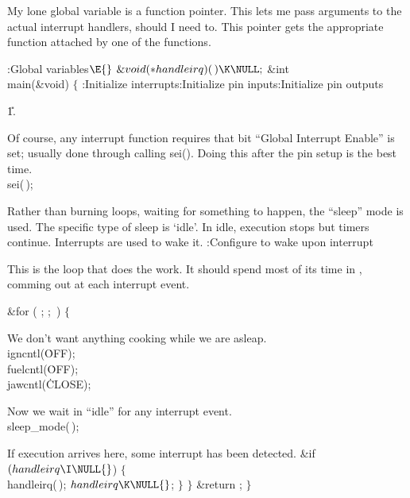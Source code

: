 My lone global variable is a function pointer.
This lets me pass arguments to the actual interrupt handlers, should I need to.
This pointer gets the appropriate function attached by one of the 
functions.

\Y\B\4:Global variables\X${}\E{}$\6
$\&{void}({*}\\{handleirq})(\,)\K\NULL;$ \&{int} \\{main}(\&{void})\1\1 $\{{}$\7
:Initialize interrupts\X{}:Initialize pin inputs\X{}:Initialize pin
outputs\X\par
\U1.\fi

Of course, any interrupt function requires that bit ``Global Interrupt Enable''
is set; usually done through calling sei(). Doing this after the pin setup is
the best time.
\Y\B\\{sei}(\,);\par
\fi

Rather than burning loops, waiting for something to happen,
the ``sleep'' mode is used.
The specific type of sleep is `idle'.
In idle, execution stops but timers continue.
Interrupts are used to wake it.
\Y\B{}:Configure to wake upon interrupt\X\par
\fi

This is the loop that does the work.
It should spend most of its time in ,
comming out at each interrupt event.

\Y\B\&{for} ( ;  ; \,) $\{{}$\Y\par
\fi

We don't want anything cooking while we are asleap.
\Y\B\\{igncntl}(\.{OFF});\6
\\{fuelcntl}(\.{OFF});\6
\\{jawcntl}(\.{CLOSE});\par
\fi

Now we wait in ``idle'' for any interrupt event.
\Y\B\\{sleep\_mode}(\,);\par
\fi

If execution arrives here, some interrupt has been detected.
\Y\B\&{if} ${}(\\{handleirq}\I\NULL{}$)\6
${}\{{}$\1\6
\\{handleirq}(\,);\6
${}\\{handleirq}\K\NULL{}$;\6
\4${}\}{}$\2\6
$\}{}$\6
\&{return} ;\6
$\}{}$\par
\fi

